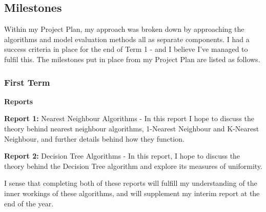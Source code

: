 \documentclass[letterpaper,10pt]{article}
\begin{document}
\newpage
\subsection{Milestones}
Within my Project Plan, my approach was broken down by approaching the algorithms and model evaluation methods all as separate components. I had a success criteria in place for the end of Term 1 - and I believe I've managed to fulfil this. The milestones put in place from my Project Plan are listed as follows.

\subsubsection{First Term}
\textbf{Reports} \par
\textbf{Report 1:} Nearest Neighbour Algorithms - In this report I hope to discuss the theory behind nearest neighbour algorithms, 1-Nearest Neighbour and K-Nearest Neighbour, and further details behind how they function. \par 
\noindent \textbf{Report 2:} Decision Tree Algorithms - In this report, I hope to discuss the theory behind the Decision Tree algorithm and explore its measures of uniformity. \par
\vspace{2mm}
I sense that completing both of these reports will fulfill my understanding of the inner workings of these algorithms, and will supplement my interim report at the end of the year. \par
\end{document}
